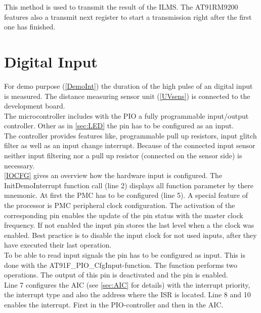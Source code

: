 \begin{itemize}
This method is used to transmit the result of the \ac{ILMS}. The AT91RM9200 features also a transmit next register to start a transmission right after the first one has finished.\cite{AT91DMA}\\
\end{itemize}



\newpage
\section{Digital Input}
For demo purpose (\autoref{DemoInt}) the duration of the high pulse of an digital input is measured. The distance measuring sensor unit (\autoref{UVsens}) is connected to the development board.\\
The microcontroller includes with the \acf{PIO} a fully programmable input/output controller. Other as in \autoref{sec:LED} the pin has to be configured as an input.\\
The controller provides features like, programmable pull up resistors, input glitch filter as well as an input change interrupt. Because of the connected input sensor neither input filtering nor a pull up resistor (connected on the sensor side) is necessary.\\ 
\autoref{IOCFG} gives an overview how the hardware input is configured. The InitDemoInterrupt function call (line 2) displays all function parameter by there mnemonic. At first the \ac{PMC} has to be configured (line 5). A special feature of the processor is \ac{PMC} peripheral clock configuration. The activation of the corresponding pin enables the update of the pin status with the master clock frequency. If not enabled the input pin stores the last level when a the clock was enabled. Best practice is to disable the input clock for not used inputs, after they have executed their last operation.\cite{AT91PMC}\\
To be able to read input signals the pin has to be configured as input. This is done with the AT91F\_PIO\_CfgInput-function. The function performs two operations. The output of this pin is deactivated and the pin is enabled.\\
Line 7 configures the \ac{AIC} (see \autoref{sec:AIC} for details) with the interrupt priority, the interrupt type and also the address where the \ac{ISR} is located. Line 8 and 10 enables the interrupt. First in the \ac{PIO}-controller and then in the \ac{AIC}.\\
